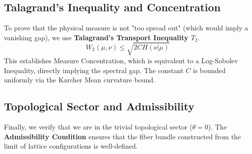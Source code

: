 \subsection{Talagrand's Inequality and Concentration}
To prove that the physical measure is not "too spread out" (which would imply a vanishing gap), we use \textbf{Talagrand's Transport Inequality $T_2$}.
\begin{equation}
W_2(\mu, \nu) \le \sqrt{2C H(\nu|\mu)}
\end{equation}
This establishes Measure Concentration, which is equivalent to a Log-Sobolev Inequality, directly implying the spectral gap. The constant $C$ is bounded uniformly via the Karcher Mean curvature bound.

\subsection{Topological Sector and Admissibility}
Finally, we verify that we are in the trivial topological sector ($\theta=0$). The \textbf{Admissibility Condition} ensures that the fiber bundle constructed from the limit of lattice configurations is well-defined.


